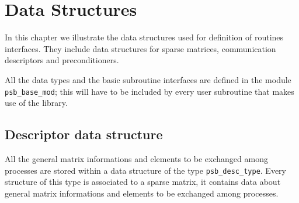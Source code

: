 \section{Data Structures}
\label{sec:datastruct}

In this chapter we  illustrate the  data structures used for definition of
routines interfaces. They  include data structures for sparse matrices,
communication descriptors and preconditioners.%

All the data types and the basic subroutine interfaces are defined in
the module \verb|psb_base_mod|; this will have to be included by every
user subroutine that makes use of the library. 



\subsection{Descriptor data structure}
\label{sec:desc}
All the general matrix informations and elements to be
exchanged among processes are stored within a data structure of the
type \hypertarget{descdata}{{\tt psb\_desc\_type}}. 
Every structure of this type is associated to a sparse matrix, it
contains data about general matrix informations and elements to be
exchanged among processes.  

